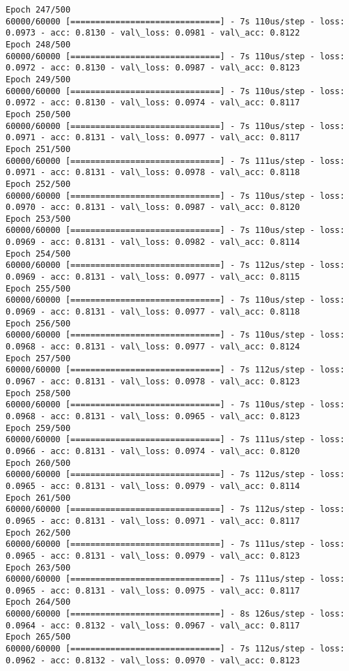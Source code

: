 \documentclass[11pt]{article}
\begin{document}
\begin{Verbatim}[commandchars=\\\{\}]
Epoch 247/500
60000/60000 [==============================] - 7s 110us/step - loss: 0.0973 - acc: 0.8130 - val\_loss: 0.0981 - val\_acc: 0.8122
Epoch 248/500
60000/60000 [==============================] - 7s 110us/step - loss: 0.0972 - acc: 0.8130 - val\_loss: 0.0987 - val\_acc: 0.8123
Epoch 249/500
60000/60000 [==============================] - 7s 110us/step - loss: 0.0972 - acc: 0.8130 - val\_loss: 0.0974 - val\_acc: 0.8117
Epoch 250/500
60000/60000 [==============================] - 7s 110us/step - loss: 0.0971 - acc: 0.8131 - val\_loss: 0.0977 - val\_acc: 0.8117
Epoch 251/500
60000/60000 [==============================] - 7s 111us/step - loss: 0.0971 - acc: 0.8131 - val\_loss: 0.0978 - val\_acc: 0.8118
Epoch 252/500
60000/60000 [==============================] - 7s 110us/step - loss: 0.0970 - acc: 0.8131 - val\_loss: 0.0987 - val\_acc: 0.8120
Epoch 253/500
60000/60000 [==============================] - 7s 110us/step - loss: 0.0969 - acc: 0.8131 - val\_loss: 0.0982 - val\_acc: 0.8114
Epoch 254/500
60000/60000 [==============================] - 7s 112us/step - loss: 0.0969 - acc: 0.8131 - val\_loss: 0.0977 - val\_acc: 0.8115
Epoch 255/500
60000/60000 [==============================] - 7s 110us/step - loss: 0.0969 - acc: 0.8131 - val\_loss: 0.0977 - val\_acc: 0.8118
Epoch 256/500
60000/60000 [==============================] - 7s 110us/step - loss: 0.0968 - acc: 0.8131 - val\_loss: 0.0977 - val\_acc: 0.8124
Epoch 257/500
60000/60000 [==============================] - 7s 112us/step - loss: 0.0967 - acc: 0.8131 - val\_loss: 0.0978 - val\_acc: 0.8123
Epoch 258/500
60000/60000 [==============================] - 7s 110us/step - loss: 0.0968 - acc: 0.8131 - val\_loss: 0.0965 - val\_acc: 0.8123
Epoch 259/500
60000/60000 [==============================] - 7s 111us/step - loss: 0.0966 - acc: 0.8131 - val\_loss: 0.0974 - val\_acc: 0.8120
Epoch 260/500
60000/60000 [==============================] - 7s 112us/step - loss: 0.0965 - acc: 0.8131 - val\_loss: 0.0979 - val\_acc: 0.8114
Epoch 261/500
60000/60000 [==============================] - 7s 112us/step - loss: 0.0965 - acc: 0.8131 - val\_loss: 0.0971 - val\_acc: 0.8117
Epoch 262/500
60000/60000 [==============================] - 7s 111us/step - loss: 0.0965 - acc: 0.8131 - val\_loss: 0.0979 - val\_acc: 0.8123
Epoch 263/500
60000/60000 [==============================] - 7s 111us/step - loss: 0.0965 - acc: 0.8131 - val\_loss: 0.0975 - val\_acc: 0.8117
Epoch 264/500
60000/60000 [==============================] - 8s 126us/step - loss: 0.0964 - acc: 0.8132 - val\_loss: 0.0967 - val\_acc: 0.8117
Epoch 265/500
60000/60000 [==============================] - 7s 112us/step - loss: 0.0962 - acc: 0.8132 - val\_loss: 0.0970 - val\_acc: 0.8123

\end{Verbatim}
\end{document}
